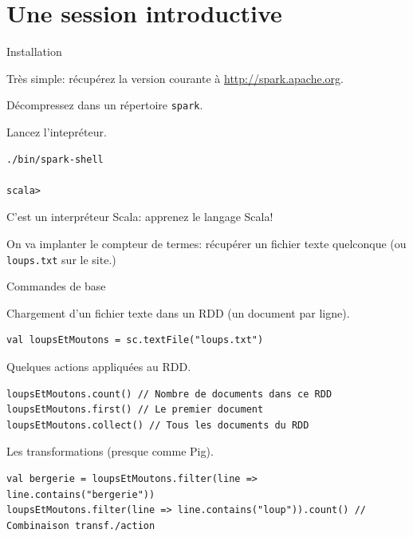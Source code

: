 \section{Une session introductive}

\begin{frame}[fragile]{Installation}

Très simple: récupérez la version courante à \url{http://spark.apache.org}.

\vfill

Décompressez dans un répertoire \texttt{spark}.

\vfill

Lancez l'intepréteur.


\begin{verbatim}
./bin/spark-shell

scala>
\end{verbatim}

\vfill

C'est un interpréteur Scala: apprenez le langage Scala! 

\vfill
 
On va implanter le compteur de termes: récupérer un fichier texte quelconque (ou \texttt{loups.txt}
sur le site.)
\end{frame}


\begin{frame}[fragile]{Commandes de base}

Chargement d'un fichier texte dans un RDD (un document par ligne).

\begin{verbatim}
val loupsEtMoutons = sc.textFile("loups.txt")
\end{verbatim}

\vfill

Quelques \alert{actions} appliquées au RDD.

\begin{verbatim}
loupsEtMoutons.count() // Nombre de documents dans ce RDD
loupsEtMoutons.first() // Le premier document
loupsEtMoutons.collect() // Tous les documents du RDD
\end{verbatim}

\vfill

Les \alert{transformations} (presque comme Pig).


\begin{verbatim}
val bergerie = loupsEtMoutons.filter(line => line.contains("bergerie"))
loupsEtMoutons.filter(line => line.contains("loup")).count() // Combinaison transf./action
\end{verbatim}

\end{frame}



